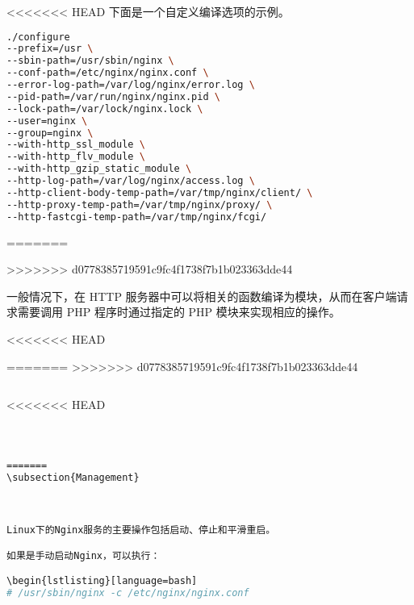 <<<<<<< HEAD
下面是一个自定义编译选项的示例。

\begin{lstlisting}[language=bash]
./configure
--prefix=/usr \
--sbin-path=/usr/sbin/nginx \
--conf-path=/etc/nginx/nginx.conf \
--error-log-path=/var/log/nginx/error.log \
--pid-path=/var/run/nginx/nginx.pid \
--lock-path=/var/lock/nginx.lock \
--user=nginx \
--group=nginx \
--with-http_ssl_module \
--with-http_flv_module \
--with-http_gzip_static_module \
--http-log-path=/var/log/nginx/access.log \
--http-client-body-temp-path=/var/tmp/nginx/client/ \
--http-proxy-temp-path=/var/tmp/nginx/proxy/ \
--http-fastcgi-temp-path=/var/tmp/nginx/fcgi/
\end{lstlisting}
=======

>>>>>>> d0778385719591c9fc4f1738f7b1b023363dde44


一般情况下，在 HTTP 服务器中可以将相关的函数编译为模块，从而在客户端请求需要调用 PHP 程序时通过指定的 PHP 模块来实现相应的操作。





<<<<<<< HEAD


=======
>>>>>>> d0778385719591c9fc4f1738f7b1b023363dde44
\begin{lstlisting}[language=bash]

\end{lstlisting}

<<<<<<< HEAD



\begin{lstlisting}[language=bash]

\end{lstlisting}




\begin{lstlisting}[language=bash]

\end{lstlisting}









\begin{lstlisting}[language=bash]

=======
\subsection{Management}



Linux下的Nginx服务的主要操作包括启动、停止和平滑重启。

如果是手动启动Nginx，可以执行：

\begin{lstlisting}[language=bash]
# /usr/sbin/nginx -c /etc/nginx/nginx.conf
\end{lstlisting}

